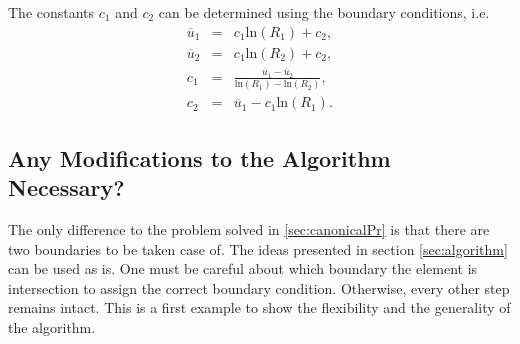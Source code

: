 \documentclass[a4paper,12pt]{article}
\begin{document}
The constants $c_1$ and $c_2$ can be determined using the boundary conditions, i.e.
\begin{eqnarray}
\overline{u}_1 &=& c_1 \text{ln}(R_1) + c_2,\\
\overline{u}_2 &=& c_1 \text{ln}(R_2) + c_2,\\
c_1 &=& \frac{\overline{u}_1 - \overline{u}_2}{\text{ln}(R_1) - \text{ln}(R_2)},\\
c_2 &=& \overline{u}_1 - c_1 \text{ln}(R_1).
\end{eqnarray}
\subsection{Any Modifications to the Algorithm Necessary?}
The only difference to the problem solved in \ref{sec:canonicalPr} is that there are two boundaries to be taken case of. The ideas presented in section \ref{sec:algorithm} can be used as is. One must be careful about which boundary the element is intersection to assign the correct boundary condition. Otherwise, every other step remains intact. This is a first example to show the flexibility and the generality of the algorithm.
\end{document}
